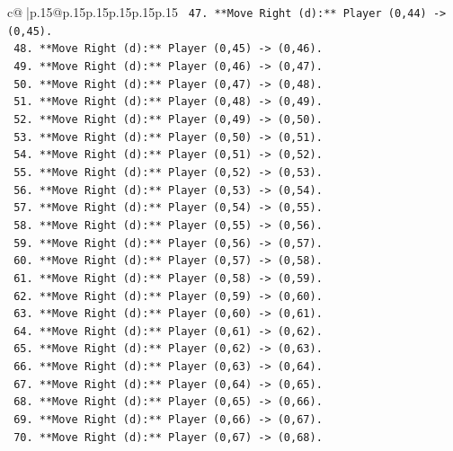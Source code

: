 \documentclass{article}
\begin{document}
{\begin{supertabular}{c@{$\;$}|p{.15\linewidth}@{}p{.15\linewidth}p{.15\linewidth}p{.15\linewidth}p{.15\linewidth}p{.15\linewidth}}
{{{\texttt{        47. **Move Right (d):** Player (0,44) {-}> (0,45).} \\
\texttt{        48. **Move Right (d):** Player (0,45) {-}> (0,46).} \\
\texttt{        49. **Move Right (d):** Player (0,46) {-}> (0,47).} \\
\texttt{        50. **Move Right (d):** Player (0,47) {-}> (0,48).} \\
\texttt{        51. **Move Right (d):** Player (0,48) {-}> (0,49).} \\
\texttt{        52. **Move Right (d):** Player (0,49) {-}> (0,50).} \\
\texttt{        53. **Move Right (d):** Player (0,50) {-}> (0,51).} \\
\texttt{        54. **Move Right (d):** Player (0,51) {-}> (0,52).} \\
\texttt{        55. **Move Right (d):** Player (0,52) {-}> (0,53).} \\
\texttt{        56. **Move Right (d):** Player (0,53) {-}> (0,54).} \\
\texttt{        57. **Move Right (d):** Player (0,54) {-}> (0,55).} \\
\texttt{        58. **Move Right (d):** Player (0,55) {-}> (0,56).} \\
\texttt{        59. **Move Right (d):** Player (0,56) {-}> (0,57).} \\
\texttt{        60. **Move Right (d):** Player (0,57) {-}> (0,58).} \\
\texttt{        61. **Move Right (d):** Player (0,58) {-}> (0,59).} \\
\texttt{        62. **Move Right (d):** Player (0,59) {-}> (0,60).} \\
\texttt{        63. **Move Right (d):** Player (0,60) {-}> (0,61).} \\
\texttt{        64. **Move Right (d):** Player (0,61) {-}> (0,62).} \\
\texttt{        65. **Move Right (d):** Player (0,62) {-}> (0,63).} \\
\texttt{        66. **Move Right (d):** Player (0,63) {-}> (0,64).} \\
\texttt{        67. **Move Right (d):** Player (0,64) {-}> (0,65).} \\
\texttt{        68. **Move Right (d):** Player (0,65) {-}> (0,66).} \\
\texttt{        69. **Move Right (d):** Player (0,66) {-}> (0,67).} \\
\texttt{        70. **Move Right (d):** Player (0,67) {-}> (0,68).} \\
}}}
\end{supertabular}}
\end{document}

